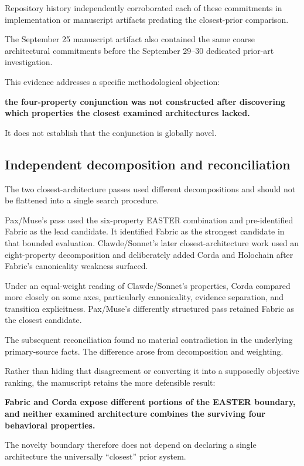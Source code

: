 \documentclass[11pt]{article}
\begin{document}
Repository history independently corroborated each of these commitments in implementation or manuscript artifacts predating the closest-prior comparison.

The September 25 manuscript artifact also contained the same coarse architectural commitments before the September 29--30 dedicated prior-art investigation.

This evidence addresses a specific methodological objection:

\textbf{the four-property conjunction was not constructed after discovering which properties the closest examined architectures lacked.}

It does not establish that the conjunction is globally novel.

\subsection{Independent decomposition and reconciliation}

The two closest-architecture passes used different decompositions and should not be flattened into a single search procedure.

Pax/Muse's pass used the six-property EASTER combination and pre-identified Fabric as the lead candidate. It identified Fabric as the strongest candidate in that bounded evaluation. Clawde/Sonnet's later closest-architecture work used an eight-property decomposition and deliberately added Corda and Holochain after Fabric's canonicality weakness surfaced.

Under an equal-weight reading of Clawde/Sonnet's properties, Corda compared more closely on some axes, particularly canonicality, evidence separation, and transition explicitness. Pax/Muse's differently structured pass retained Fabric as the closest candidate.

The subsequent reconciliation found no material contradiction in the underlying primary-source facts. The difference arose from decomposition and weighting.

Rather than hiding that disagreement or converting it into a supposedly objective ranking, the manuscript retains the more defensible result:

\textbf{Fabric and Corda expose different portions of the EASTER boundary, and neither examined architecture combines the surviving four behavioral properties.}

The novelty boundary therefore does not depend on declaring a single architecture the universally “closest” prior system.
\end{document}
